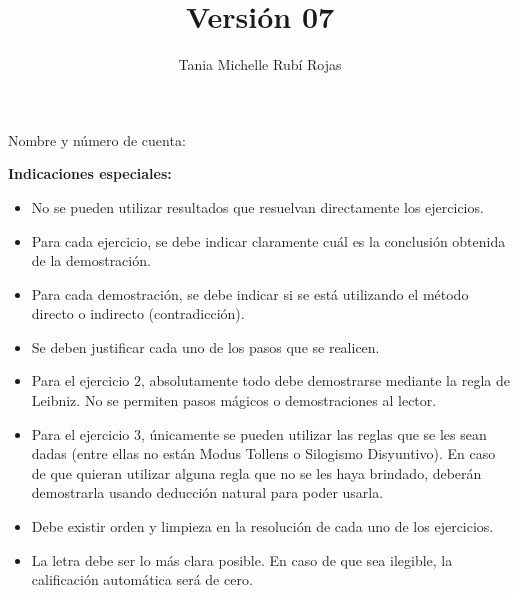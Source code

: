 \documentclass[oneside]{style}
\title{Versión 07}
\author{Tania Michelle Rubí Rojas}
\begin{document}
\maketitle

\vspace{2.5mm}
\noindent
Nombre y número de cuenta: \hrulefill\

\vspace{5mm}
\noindent
\textbf{Indicaciones especiales:}
{\small
\begin{multicols}{2}
\begin{itemize}
  \item No se pueden utilizar resultados que resuelvan directamente los 
  ejercicios. 

  \item Para cada ejercicio, se debe indicar claramente cuál es la conclusión 
  obtenida de la demostración. 

  \item Para cada demostración, se debe indicar si se está utilizando 
  el método directo o indirecto (contradicción).  

  \item Se deben justificar cada uno de los pasos que se realicen. 
  
  \item Para el ejercicio $2$, absolutamente todo debe demostrarse mediante la 
  regla de Leibniz. No se permiten pasos mágicos o demostraciones al lector. 

  \item Para el ejercicio $3$, únicamente se pueden utilizar las reglas que 
  se les sean dadas (entre ellas no están Modus Tollens o Silogismo 
  Disyuntivo). En caso de que quieran utilizar alguna regla que no se les haya 
  brindado, deberán demostrarla usando deducción natural para poder usarla. 
  
  \item Debe existir orden y limpieza en la resolución de cada uno de los 
  ejercicios. 

  \item La letra debe ser lo más clara posible. En caso de que sea ilegible, 
  la calificación automática será de cero. 
\end{itemize}
\end{multicols}
}
\end{document}
